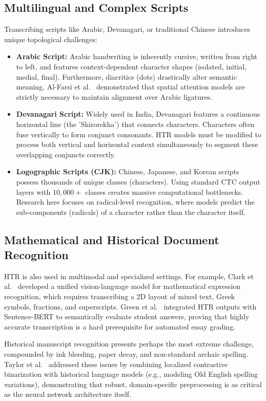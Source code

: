 \subsection{Multilingual and Complex Scripts}
Transcribing scripts like Arabic, Devanagari, or traditional Chinese introduces unique topological challenges:
\begin{itemize}
    \item \textbf{Arabic Script:} Arabic handwriting is inherently cursive, written from right to left, and features context-dependent character shapes (isolated, initial, medial, final). Furthermore, diacritics (dots) drastically alter semantic meaning. Al-Farsi et al.~\cite{study2025arabic} demonstrated that spatial attention models are strictly necessary to maintain alignment over Arabic ligatures.
    \item \textbf{Devanagari Script:} Widely used in India, Devanagari features a continuous horizontal line (the 'Shirorekha') that connects characters. Characters often fuse vertically to form conjunct consonants. HTR models must be modified to process both vertical and horizontal context simultaneously to segment these overlapping conjuncts correctly.
    \item \textbf{Logographic Scripts (CJK):} Chinese, Japanese, and Korean scripts possess thousands of unique classes (characters). Using standard CTC output layers with $10,000+$ classes creates massive computational bottlenecks. Research here focuses on radical-level recognition, where models predict the sub-components (radicals) of a character rather than the character itself.
\end{itemize}

\subsection{Mathematical and Historical Document Recognition}
HTR is also used in multimodal and specialized settings. For example, Clark et al.~\cite{study2025unimumer} developed a unified vision-language model for mathematical expression recognition, which requires transcribing a 2D layout of mixed text, Greek symbols, fractions, and superscripts. Green et al.~\cite{study2025automated} integrated HTR outputs with Sentence-BERT to semantically evaluate student answers, proving that highly accurate transcription is a hard prerequisite for automated essay grading.

Historical manuscript recognition presents perhaps the most extreme challenge, compounded by ink bleeding, paper decay, and non-standard archaic spelling. Taylor et al.~\cite{study2024historical} addressed these issues by combining localized contrastive binarization with historical language models (e.g., modeling Old English spelling variations), demonstrating that robust, domain-specific preprocessing is as critical as the neural network architecture itself.



